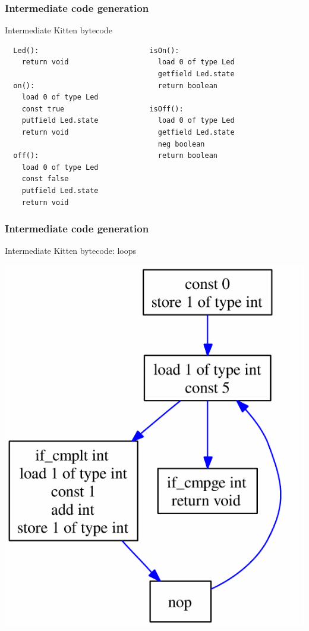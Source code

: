 \documentclass[11pt]{beamer}  %
\begin{document}
\begin{frame}[fragile]
\frametitle{Intermediate code generation}

\begin{greenbox}{Intermediate Kitten bytecode}
\begin{verbatim}
  Led():                          isOn():
    return void                     load 0 of type Led
                                    getfield Led.state
  on():                             return boolean
    load 0 of type Led
    const true                    isOff():
    putfield Led.state              load 0 of type Led
    return void                     getfield Led.state
                                    neg boolean
  off():                            return boolean
    load 0 of type Led
    const false
    putfield Led.state
    return void
\end{verbatim}
\end{greenbox}

\end{frame}

\begin{frame}
\frametitle{Intermediate code generation}

\begin{greenbox}{Intermediate Kitten bytecode: loops}
\begin{center}
\includegraphics[scale=0.6]{pictures/loop.pdf}
\end{center}
\end{greenbox}
\end{frame}
\end{document}
